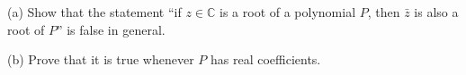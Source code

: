 (a) Show that the statement ``if $z\in\mathbb C$ is a root of a polynomial $P$, then $\bar z$ is also a root of $P$'' is false in general.

(b) Prove that it is true whenever $P$ has real coefficients.
